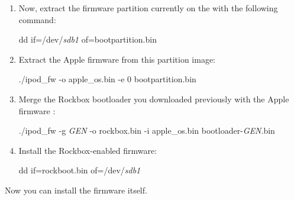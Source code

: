 \begin{enumerate}
  \item Now, extract the firmware partition currently on the \dap{} with the
    following command:
    \begin{code}
    dd if=/dev/\emph{sdb1} of=bootpartition.bin
    \end{code}
  \item Extract the Apple firmware from this partition image:
    \begin{code}
    ./ipod_fw -o apple_os.bin -e 0 bootpartition.bin
    \end{code}

  \item Merge the Rockbox bootloader you downloaded previously with the Apple
    firmware :
    \begin{code}
    ./ipod_fw -g \emph{GEN} -o rockbox.bin -i apple_os.bin bootloader-\emph{GEN}.bin
    \end{code}
  \item
    Install the Rockbox-enabled firmware:
    \begin{code}
    dd if=rockboot.bin of=/dev/\emph{sdb1}
    \end{code}
\end{enumerate}
Now you can install the firmware itself.

